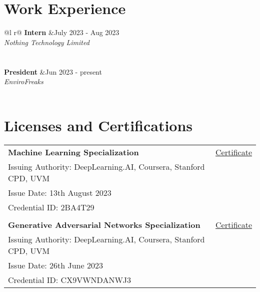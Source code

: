 \documentclass[a4paper,16pt]{article}
\begin{document}
\section{Work Experience}
\begin{tabularx}{\linewidth}{ @{}l r@{} }
\textbf{Intern} &\hfill July 2023 - Aug 2023 \\
\textit{Nothing Technology Limited}\\
 \\
\\
\textbf{President} &\hfill Jun 2023 - present \\
\textit{EnviroFreaks} \\
\\ 
\end{tabularx}


\section{Licenses and Certifications}
\begin{tabularx}{\linewidth}{@{}l X@{}}
\textbf{Machine Learning Specialization} & \hfill \href{https://coursera.org/share/e5f69c8847cbb428924e6137cabc85cb}{Certificate} \\
Issuing Authority: DeepLearning.AI, Coursera, Stanford CPD, UVM \\
Issue Date: 13th August 2023 \\
Credential ID: 2BA4T29 \\
\\
\textbf{Generative Adversarial Networks Specialization} & \hfill \href{https://coursera.org/share/d7f6fa430466230cfed92de8a35e64da}{Certificate} \\
Issuing Authority: DeepLearning.AI, Coursera, Stanford CPD, UVM \\
Issue Date: 26th June 2023 \\
Credential ID: CX9VWNDANWJ3 \\
\end{tabularx}
\end{document}
